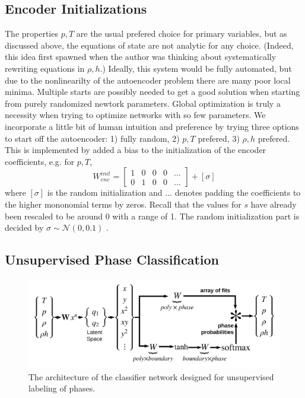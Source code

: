 \documentclass[]{article}
\begin{document}
\hypertarget{header-n3312}{%
\subsection{Encoder Initializations}\label{header-n3312}}

The properties \(p,T\) are the usual prefered choice for primary
variables, but as discussed above, the equations of state are not
analytic for any choice. (Indeed, this idea first spawned when the
author was thinking about systematically rewriting equations in
\(\rho,h\).) Ideally, this system would be fully automated, but due to
the nonlinearilty of the autoencoder problem there are many poor local minima.
Multiple starts are possibly needed
to get a good solution when starting from purely randomized newtork
parameters. Global optimization is truly a necessity when trying to
optimize networks with so few parameters. We incorporate a little bit of
human intuition and preference by trying three options to start off the
autoencoder: 1) fully random, 2) \(p,T\) prefered, 3) \(\rho,h\)
prefered. This is implemented by added a bias to the initialization of
the encoder coefficients, e.g. for \(p,T\),
\begin{equation}
 W^{init}_{enc} = \left[\begin{array}{ccccc}
1 & 0 & 0 & 0 & ... \\
0 & 1 & 0 & 0 & ...
                        \end{array}\right]+[\sigma]
\end{equation}
where \([\sigma]\) is the random initialization and \(…\) denotes
padding the coefficients to the higher mononomial terms by zeros. Recall that the
values for \(s\) have already been rescaled to be around 0 with a range
of 1. The random initialization part is decided by
\(\sigma \sim \mathcal{N}(0,0.1)\) .

\hypertarget{header-n3317}{%
\subsection{Unsupervised Phase Classification}\label{header-n3317}}


\begin{figure}
\centering
\includegraphics{../figures/classifier_network.png}
\caption{\label{fig:classifyingnetwork}The architecture of the classifier network designed for
  unsupervised labeling of phases.}
\end{figure}
\end{document}
